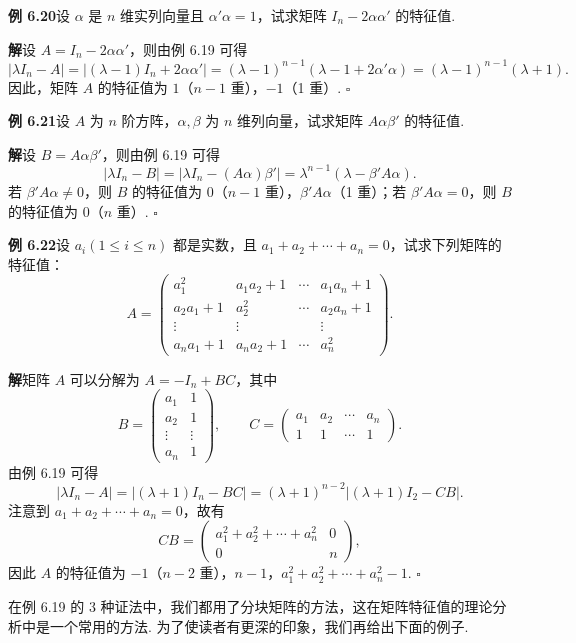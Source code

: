 \documentclass[UTF8, 12pt, fontset=fandol, oneside]{ctexart}
\begin{document}
\noindent\textbf{例 6.20}\quad 设 $\alpha$ 是 $n$ 维实列向量且 $\alpha'\alpha=1$，试求矩阵 $I_n-2\alpha\alpha'$ 的特征值.

\noindent\textbf{解}\quad 设 $A=I_n-2\alpha\alpha'$，则由例 6.19 可得
\[
|\lambda I_n-A|=|(\lambda-1)I_n+2\alpha\alpha'|
=(\lambda-1)^{n-1}(\lambda-1+2\alpha'\alpha)
=(\lambda-1)^{n-1}(\lambda+1).
\]
因此，矩阵 $A$ 的特征值为 $1$（$n-1$ 重），$-1$（1 重）. $\square$

\noindent\textbf{例 6.21}\quad 设 $A$ 为 $n$ 阶方阵，$\alpha,\beta$ 为 $n$ 维列向量，试求矩阵 $A\alpha\beta'$ 的特征值.

\noindent\textbf{解}\quad 设 $B=A\alpha\beta'$，则由例 6.19 可得
\[
|\lambda I_n-B|=|\lambda I_n-(A\alpha)\beta'|=\lambda^{n-1}(\lambda-\beta'A\alpha).
\]
若 $\beta'A\alpha\ne 0$，则 $B$ 的特征值为 $0$（$n-1$ 重），$\beta'A\alpha$（1 重）；若 $\beta'A\alpha=0$，则 $B$ 的特征值为 $0$（$n$ 重）. $\square$

\noindent\textbf{例 6.22}\quad 设 $a_i(1\le i\le n)$ 都是实数，且 $a_1+a_2+\cdots+a_n=0$，试求下列矩阵的特征值：
\[
A=\left(\begin{array}{cccc}
a_1^2 & a_1a_2+1 & \cdots & a_1a_n+1\\
a_2a_1+1 & a_2^2 & \cdots & a_2a_n+1\\
\vdots & \vdots & & \vdots\\
a_na_1+1 & a_na_2+1 & \cdots & a_n^2
\end{array}\right).
\]

\noindent\textbf{解}\quad 矩阵 $A$ 可以分解为 $A=-I_n+BC$，其中
\[
B=\left(\begin{array}{cc}
a_1 & 1\\
a_2 & 1\\
\vdots & \vdots\\
a_n & 1
\end{array}\right),\qquad
C=\left(\begin{array}{cccc}
a_1 & a_2 & \cdots & a_n\\
1 & 1 & \cdots & 1
\end{array}\right).
\]
由例 6.19 可得
\[
|\lambda I_n-A|=|(\lambda+1)I_n-BC|
=(\lambda+1)^{n-2}|(\lambda+1)I_2-CB|.
\]
注意到 $a_1+a_2+\cdots+a_n=0$，故有
\[
CB=\left(\begin{array}{cc}
a_1^2+a_2^2+\cdots+a_n^2 & 0\\
0 & n
\end{array}\right),
\]
因此 $A$ 的特征值为 $-1$（$n-2$ 重），$n-1$，$a_1^2+a_2^2+\cdots+a_n^2-1$. $\square$

在例 6.19 的 3 种证法中，我们都用了分块矩阵的方法，这在矩阵特征值的理论分析中是一个常用的方法. 为了使读者有更深的印象，我们再给出下面的例子.
\end{document}
